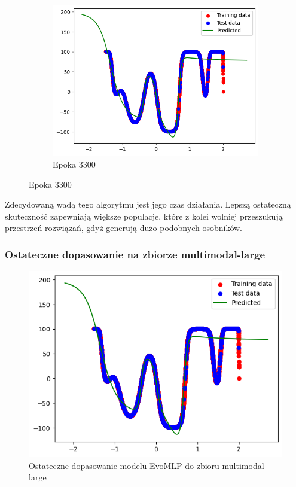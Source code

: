 \documentclass{article}
\begin{document}
\begin{figure}[H]
\begin{subfigure}{0.32\textwidth}
        \includegraphics[width=\linewidth]{img/ae3/mml9.png}
        \caption{Epoka 3300}
    \end{subfigure}
\end{figure}

Zdecydowaną wadą tego algorytmu jest jego czas działania. Lepszą ostateczną skuteczność zapewniają większe populacje, które z kolei wolniej przeszukują przestrzeń rozwiązań, gdyż generują dużo podobnych osobników. 

\newpage
\subsubsection*{Ostateczne dopasowanie na zbiorze multimodal-large}
\begin{figure}[H]
    \centering
    \includegraphics[width=\textwidth]{img/ae3/mml9.png}
    \caption{Ostateczne dopasowanie modelu EvoMLP do zbioru multimodal-large}
\end{figure}
\end{document}
